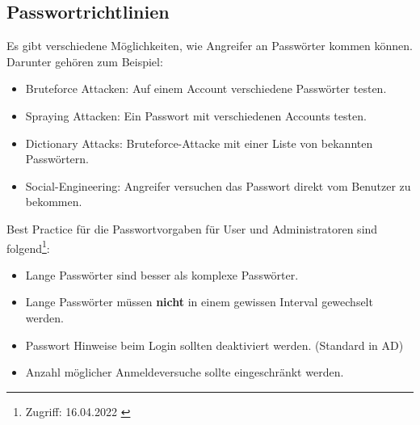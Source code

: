 \subsection{Passwortrichtlinien}
Es gibt verschiedene Möglichkeiten, wie Angreifer an Passwörter kommen können.
Darunter gehören zum Beispiel:
\begin{itemize}
    \item Bruteforce Attacken: Auf einem Account verschiedene Passwörter testen.
    \item Spraying Attacken: Ein Passwort mit verschiedenen Accounts testen.
    \item Dictionary Attacks: Bruteforce-Attacke mit einer Liste von bekannten Passwörtern.
    \item Social-Engineering: Angreifer versuchen das Passwort direkt vom Benutzer zu bekommen.
\end{itemize}

Best Practice für die Passwortvorgaben für User und Administratoren sind folgend\footnote{Zugriff: 16.04.2022 \cite{nist-digital-identity-guidelines}}:
\begin{itemize}
    \item Lange Passwörter sind besser als komplexe Passwörter.
    \item Lange Passwörter müssen \textbf{nicht} in einem gewissen Interval gewechselt werden.
    \item Passwort Hinweise beim Login sollten deaktiviert werden. (Standard in AD)
    \item Anzahl möglicher Anmeldeversuche sollte eingeschränkt werden.
\end{itemize}

